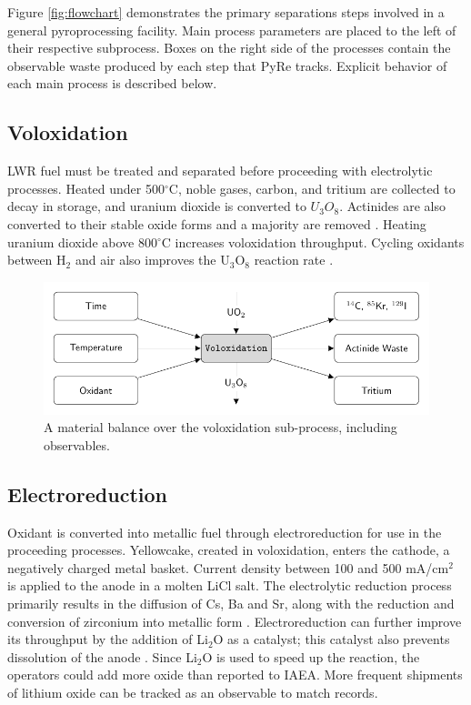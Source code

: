 \documentclass{anstrans}
\begin{document}
Figure \ref{fig:flowchart} demonstrates the primary separations steps involved in a general pyroprocessing facility. Main process parameters are placed to the left of their respective subprocess. Boxes on the 
right side of the processes contain the observable waste produced by each step that PyRe tracks. Explicit behavior of each main process is described below. 

\subsection{Voloxidation}

LWR fuel must be treated and separated before proceeding with electrolytic processes. Heated under 
500$^{\circ}$C, noble gases, carbon, and tritium are collected to decay in storage, and uranium dioxide is converted to $U_3O_8$. 
Actinides are also converted to their stable oxide forms and a majority are removed \cite{flowsheet_1998,jubin_spent_2009}. 
Heating uranium dioxide above 800$^{\circ}$C increases voloxidation throughput.
Cycling oxidants between H$_2$ and air also improves the U$_3$O$_8$ reaction rate \cite{jubin_spent_2009}.

\begin{figure}[ht]
	\centering
	\includegraphics[width=1\linewidth]{volox}
	\caption{A material balance over the voloxidation sub-process, including observables.}
	\label{fig:volox}
\end{figure}

\subsection{Electroreduction}

Oxidant is converted into metallic fuel through electroreduction for use in the proceeding processes. Yellowcake, created in voloxidation, enters the cathode, a negatively charged metal basket. Current density between 100 and 500 mA/cm$^2$ 
is applied to the anode in a molten LiCl salt. The electrolytic reduction process primarily results in the diffusion of 
Cs, Ba and Sr, along with the reduction and conversion of zirconium into metallic form \cite{choi_electrochemical_2015,flowsheet_1998}.
Electroreduction can further improve its throughput by the addition of Li$_2$O as a catalyst; this catalyst also prevents dissolution 
of the anode \cite{choi_electrochemical_2015}. Since Li$_2$O is used to speed up the reaction,
the operators could add more oxide than reported to IAEA. More frequent shipments 
of lithium oxide can be tracked as an observable to match records.
\end{document}
